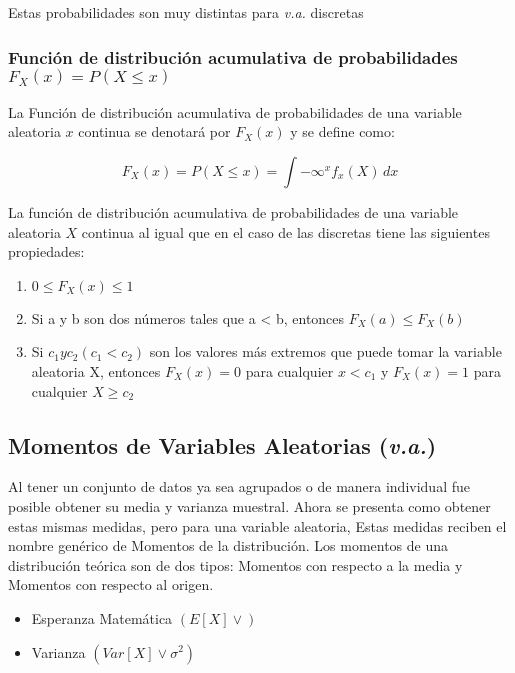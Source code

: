 Estas probabilidades son muy distintas para \textit{v.a.} discretas

\subsubsection{Función de distribución acumulativa de probabilidades $F_X(x)=P(X\leq x)$}

La Función de distribución acumulativa de probabilidades de una variable aleatoria $x$ continua se denotará por $F_X (x)$ y se define como:

\begin{equation}
    F_X(x)=P(X\leq x)=\int{-\infty}^x f_x(X)\,dx
\end{equation}

La función de distribución acumulativa de probabilidades de una variable aleatoria $X$ continua al igual que en el caso de las discretas tiene las siguientes propiedades:

\begin{enumerate}
    \item $0\leq F_X(x)\leq 1$
    \item Si a y b son dos números tales que a < b, entonces $F_X(a) \leq  F_X(b)$
    \item Si $c_1y c_2(c_1< c_2)$ son los valores más extremos que puede tomar la variable aleatoria X, entonces $F_X(x)=0$ para cualquier $x<c_1$ y $F_X(x)=1$ para cualquier $X\geq c_2$
\end{enumerate}

\subsection{Momentos de Variables Aleatorias (\textit{v.a.})}


Al tener un conjunto de datos ya sea agrupados o de manera individual fue posible obtener su media y varianza muestral. Ahora se presenta como obtener estas mismas medidas, pero para una variable aleatoria, Estas medidas reciben el nombre genérico de Momentos de la distribución.
Los momentos de una distribución teórica son de dos tipos: Momentos con respecto a la media y Momentos con respecto al origen.

\begin{itemize}
    \item Esperanza Matemática $(E\left[ X\right]\lor)$
    \item Varianza $(Var\left[X\right] \lor \sigma^2)$
\end{itemize}


